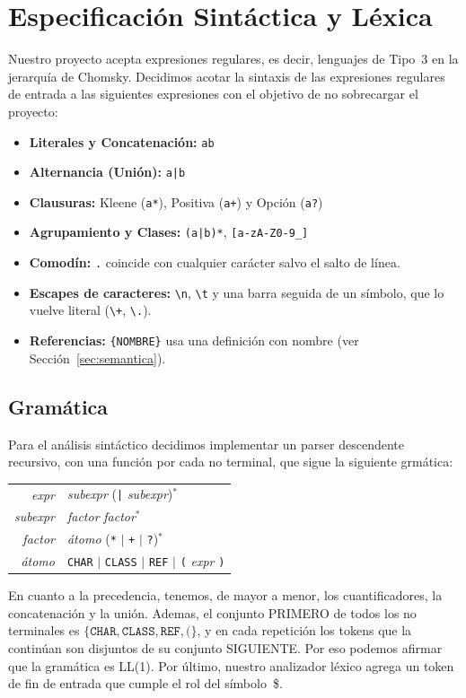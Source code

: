 \documentclass[runningheads]{llncs}
\begin{document}
\section{Especificación Sintáctica y Léxica}
Nuestro proyecto acepta expresiones regulares, es decir, lenguajes de Tipo~3 en la jerarquía de Chomsky. Decidimos acotar la sintaxis de las expresiones regulares de entrada a las siguientes expresiones con el objetivo de no sobrecargar el proyecto:
\begin{itemize}
  \item \textbf{Literales y Concatenación:} \texttt{ab}
  \item \textbf{Alternancia (Unión):} \texttt{a|b}
  \item \textbf{Clausuras:} Kleene (\texttt{a*}), Positiva (\texttt{a+}) y Opción (\texttt{a?})
  \item \textbf{Agrupamiento y Clases:} \texttt{(a|b)*}, \texttt{[a-zA-Z0-9\_]}
  \item \textbf{Comodín:} \texttt{.} coincide con cualquier carácter salvo el salto de línea.
  \item \textbf{Escapes de caracteres:} \texttt{\textbackslash n}, \texttt{\textbackslash t} y una barra seguida de un símbolo, que lo vuelve literal (\texttt{\textbackslash +}, \texttt{\textbackslash .}).
  \item \textbf{Referencias:} \texttt{\{NOMBRE\}} usa una definición con nombre (ver Sección~\ref{sec:semantica}).
\end{itemize}

\subsection{Gramática}
Para el análisis sintáctico decidimos implementar un parser descendente recursivo, con una función por cada no terminal, que sigue la siguiente grmática: 
\begin{center}
\small
\begin{tabular}{@{}r@{\ $\rightarrow$\ }l@{}}
\textit{expr}    & \textit{subexpr} (\texttt{|} \textit{subexpr})$^*$ \\
\textit{subexpr} & \textit{factor} \textit{factor}$^*$ \\
\textit{factor}  & \textit{átomo} (\texttt{*} $\mid$ \texttt{+} $\mid$ \texttt{?})$^*$ \\
\textit{átomo}   & \texttt{CHAR} $\mid$ \texttt{CLASS} $\mid$ \texttt{REF} $\mid$ \texttt{(} \textit{expr} \texttt{)}
\end{tabular}
\end{center}
En cuanto a la precedencia, tenemos, de mayor a menor, los cuantificadores, la concatenación y la unión.
Ademas, el conjunto PRIMERO de todos los no terminales es $\{\texttt{CHAR}, \texttt{CLASS}, \texttt{REF}, \texttt{(}\}$, y en cada repetición los tokens que la continúan son disjuntos de su conjunto SIGUIENTE. Por eso podemos afirmar que la gramática es LL(1). Por último, nuestro analizador léxico agrega un token de fin de entrada que cumple el rol del símbolo~\$.
\end{document}
